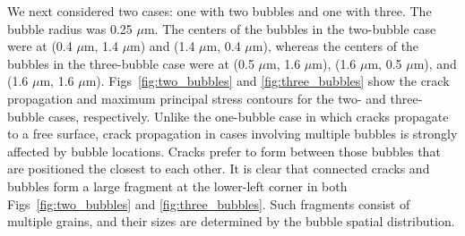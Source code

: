 We next considered two cases: one with two bubbles and one with three. The bubble radius was 0.25 $\mu$m. The centers of the bubbles in the two-bubble case were  at (0.4 $\mu$m, 1.4 $\mu$m) and (1.4 $\mu$m, 0.4 $\mu$m), whereas the centers of the bubbles in the three-bubble case were at (0.5 $\mu$m, 1.6 $\mu$m), (1.6 $\mu$m, 0.5 $\mu$m), and (1.6 $\mu$m, 1.6 $\mu$m). Figs~\ref{fig:two_bubbles} and \ref{fig:three_bubbles} show the crack propagation and maximum principal stress contours for the two- and three-bubble cases, respectively. Unlike the one-bubble case in which cracks propagate to a free surface, crack propagation in cases involving multiple bubbles is strongly affected by bubble locations. Cracks prefer to form between those bubbles that are positioned the closest to each other. It is clear that connected cracks and bubbles form a large fragment at the lower-left corner in both Figs~\ref{fig:two_bubbles} and \ref{fig:three_bubbles}. Such fragments consist of multiple grains, and their sizes are determined by the bubble spatial distribution.

